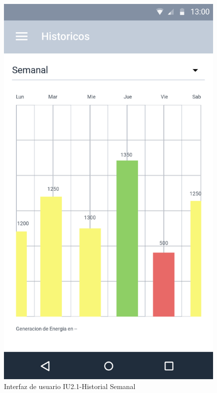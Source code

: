 \begin{figure}[H]
	\centering
	\includegraphics[scale=0.70]{Capitulo4/software/submodulos/images/semanal.png}
	\caption{Interfaz de usuario IU2.1-Historial Semanal}
	\label{fig:Historial Semanal}
\end{figure}

